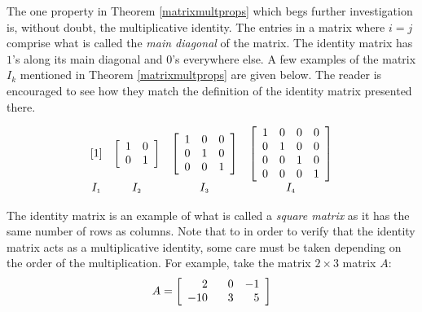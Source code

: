 \documentclass{ximera}
\begin{document}
The one property in Theorem \ref{matrixmultprops} which begs further investigation is, without doubt, the multiplicative identity.  \label{maindiagonal} The entries in a matrix where $i=j$ comprise what is called the \textit{main diagonal} of the matrix.  The identity matrix has $1$'s along its main diagonal and $0$'s everywhere else.  A few examples of the matrix $I_{k}$ mentioned in Theorem \ref{matrixmultprops} are given below.  The reader is encouraged to see how they match the definition of the identity matrix presented there.

\[ \begin{array}{ccccc}

[1] & \left[ \begin{array}{rr} 1 & 0 \\ 0 & 1 \\ \end{array} \right] & \left[ \begin{array}{rrr} 1 & 0 & 0 \\ 0 & 1 & 0 \\ 0 & 0 & 1 \\ \end{array} \right] & \left[ \begin{array}{rrrr} 1 & 0 & 0 & 0 \\ 0 & 1 & 0 & 0 \\ 0 & 0 & 1 & 0 \\  0 & 0 & 0 & 1 \\  \end{array} \right] \\
I_{\mbox{\tiny$1$}} & I_{\mbox{\tiny$2$}} & I_{\mbox{\tiny$3$}} & I_{\mbox{\tiny$4$}} \\

\end{array} \]

The identity matrix is an example of what is called a \textit{square matrix} as it has the same number of rows as columns.  Note that to in order to verify that the identity matrix acts as a multiplicative identity, some care must be taken depending on the order of the multiplication.  For example, take the matrix $2 \times 3$ matrix $A$:
\[A = \left[\begin{array}{rrr} 2 & \hphantom{-}0 & -1 \\ -10 & 3 & 5 \\ \end{array} \right]\]
\end{document}
